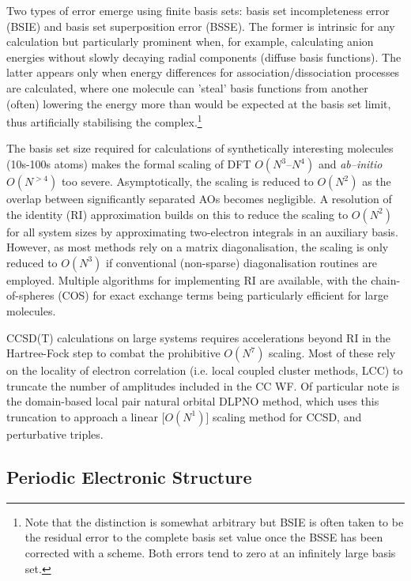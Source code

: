 \documentclass[main.tex]{subfiles}
\begin{document}
Two types of error emerge using finite basis sets: basis set incompleteness error (BSIE) and basis set superposition error (BSSE). The former is intrinsic for any calculation but particularly prominent when, for example, calculating anion energies without slowly decaying radial components (diffuse basis functions). The latter appears only when energy differences for association/dissociation processes are calculated, where one molecule can 'steal' basis functions from  another (often) lowering the energy more than would be expected at the basis set limit, thus artificially stabilising the complex.\footnote{Note that the distinction is somewhat arbitrary but BSIE is often taken to be the residual error to the complete basis set value once the BSSE has been corrected with a scheme. Both errors tend to zero at an infinitely large basis set.}\cite{BSSE1999}

The basis set size required for calculations of synthetically interesting molecules (10s-100s atoms) makes the formal scaling of DFT $O(N^3\mbox{--}N^4)$ and \emph{ab--initio} $O(N^{>4})$ too severe. Asymptotically, the scaling is reduced to $O(N^2)$ as the overlap between significantly separated AOs becomes negligible.\cite{Dyczmons1973} A resolution of the identity (RI) approximation builds on this to reduce the scaling to $O(N^2)$ for all system sizes by approximating two-electron integrals in an auxiliary basis.\cite{Hser1989} However, as most methods rely on a matrix diagonalisation, the scaling is only reduced to $O(N^3)$ if conventional (non-sparse) diagonalisation routines are employed. Multiple algorithms for implementing RI are available, with the chain-of-spheres (COS) for exact exchange terms being particularly efficient for large molecules.


CCSD(T) calculations on large systems requires accelerations beyond RI in the Hartree-Fock step to combat the prohibitive $O(N^7)$ scaling. Most of these rely on the locality of electron correlation (i.e. local coupled cluster methods, LCC) to truncate the number of amplitudes included in the CC WF.\cite{Werner2011} Of particular note is the domain-based local pair natural orbital DLPNO method, which uses this truncation to approach a linear [$O(N^1)$] scaling method for CCSD,\cite{Riplinger2013} and perturbative triples.\cite{Yang2018}

\subsection{Periodic Electronic Structure}
\end{document}
